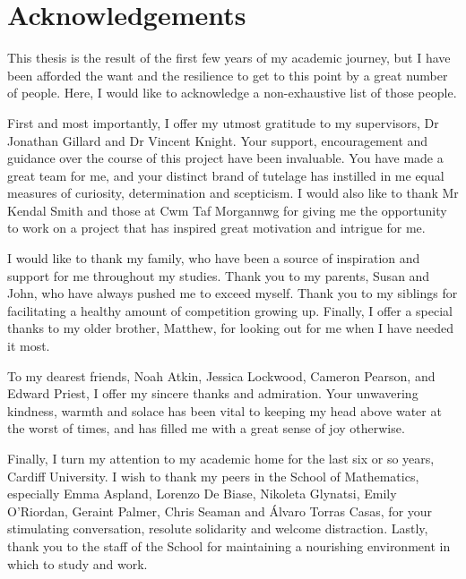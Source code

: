 \chapter*{Acknowledgements}

This thesis is the result of the first few years of my academic journey, but I
have been afforded the want and the resilience to get to this point by a great
number of people. Here, I would like to acknowledge a non-exhaustive list of
those people.

First and most importantly, I offer my utmost gratitude to my supervisors, Dr
Jonathan Gillard and Dr Vincent Knight. Your support, encouragement and guidance
over the course of this project have been invaluable. You have made a great team
for me, and your distinct brand of tutelage has instilled in me equal measures
of curiosity, determination and scepticism. I would also like to thank
Mr Kendal Smith and those at Cwm Taf Morgannwg for giving me the opportunity to
work on a project that has inspired great motivation and intrigue for me.

I would like to thank my family, who have been a source of inspiration and
support for me throughout my studies. Thank you to my parents, Susan and John,
who have always pushed me to exceed myself. Thank you to my siblings for
facilitating a healthy amount of competition growing up. Finally, I offer a
special thanks to my older brother, Matthew, for looking out for me when I have
needed it most.

To my dearest friends, Noah Atkin, Jessica Lockwood, Cameron Pearson, and Edward
Priest, I offer my sincere thanks and admiration. Your unwavering kindness,
warmth and solace has been vital to keeping my head above water at the worst of
times, and has filled me with a great sense of joy otherwise.

Finally, I turn my attention to my academic home for the last six or so years,
Cardiff University. I wish to thank my peers in the School of Mathematics,
especially Emma Aspland, Lorenzo De Biase, Nikoleta Glynatsi, Emily O'Riordan,
Geraint Palmer, Chris Seaman and \'{A}lvaro Torras Casas, for your stimulating
conversation, resolute solidarity and welcome distraction. Lastly, thank you to
the staff of the School for maintaining a nourishing environment in which to
study and work.
